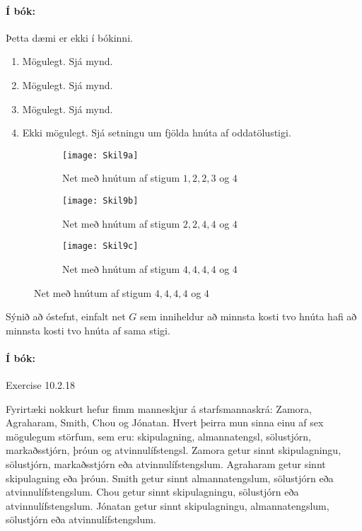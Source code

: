 \documentclass{exam}
\begin{document}
\begin{questions}
\paragraph{Í bók:} Þetta dæmi er ekki í bókinni.

\newpage

\begin{enumerate}
 \item  Mögulegt. Sjá mynd.
 \item  Mögulegt. Sjá mynd.
 \item  Mögulegt. Sjá mynd.
 \item  Ekki mögulegt. Sjá setningu um fjölda hnúta af oddatölustigi.
\end{enumerate}

\begin{figure}[hb]
\caption{Möguleg net}
\label{mynd:verkefni3}
\centering
\begin{subfigure}[b]{0.3\textwidth}
\texttt{[image: Skil9a]}
\caption{Net með hnútum af stigum $1,2,2,3$ og $4$}
\end{subfigure}
\hspace{0.5cm}
\begin{subfigure}[b]{0.3\textwidth}
\texttt{[image: Skil9b]}
\caption{Net með hnútum af stigum $2,2,4,4$ og $4$}
\end{subfigure}
\hspace{0.5cm}
\begin{subfigure}[b]{0.3\textwidth}
\texttt{[image: Skil9c]}
\caption{Net með hnútum af stigum $4,4,4,4$ og $4$}
\end{subfigure}
\end{figure}

\question Sýnið að óstefnt, einfalt net $G$ sem inniheldur að minnsta kosti tvo hnúta hafi að minnsta kosti tvo hnúta af sama stigi.

\paragraph{Í bók:} Exercise 10.2.18

\question Fyrirtæki nokkurt hefur fimm manneskjur á starfsmannaskrá: Zamora, Agraharam, Smith, Chou og Jónatan. Hvert þeirra mun sinna einu af sex mögulegum störfum, sem eru: skipulagning, almannatengsl, sölustjórn, markaðsstjórn, þróun og atvinnulífstengsl. Zamora getur sinnt skipulagningu, sölustjórn, markaðsstjórn eða atvinnulífstengslum. Agraharam getur sinnt skipulagning eða þróun. Smith getur sinnt almannatengslum, sölustjórn eða atvinnulífstengslum. Chou getur sinnt skipulagningu, sölustjórn eða atvinnulífstengslum. Jónatan getur sinnt skipulagningu, almannatengslum, sölustjórn eða atvinnulífstengslum.


\end{questions}
\end{document}
